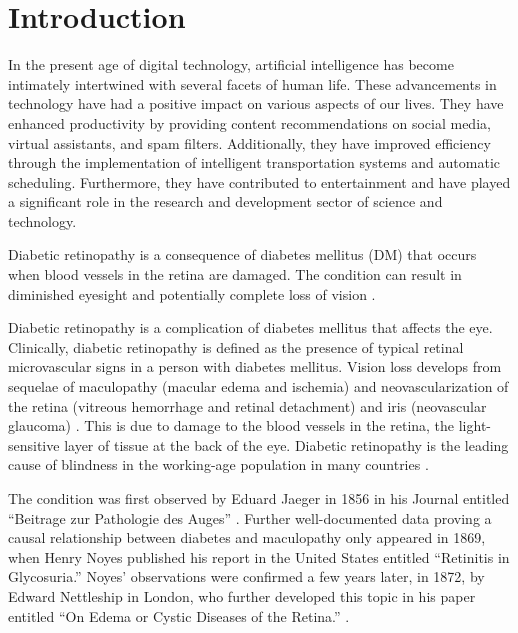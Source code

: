 \section{Introduction}
\label{sec:pendahuluan}


In the present age of digital technology, artificial intelligence has become intimately intertwined with several facets of human life. These advancements in technology have had a positive impact on various aspects of our lives. They have enhanced productivity by providing content recommendations on social media, virtual assistants, and spam filters. Additionally, they have improved efficiency through the implementation of intelligent transportation systems and automatic scheduling. Furthermore, they have contributed to entertainment and have played a significant role in the research and development sector of science and technology.
 
Diabetic retinopathy is a consequence of diabetes mellitus (DM) that occurs when blood vessels in the retina are damaged. The condition can result in diminished eyesight and potentially complete loss of vision \citet{Yusran2022}.

Diabetic retinopathy is a complication of diabetes mellitus that affects the eye. Clinically, diabetic retinopathy is defined as the presence of typical retinal microvascular signs in a person with diabetes mellitus. Vision loss develops from sequelae of maculopathy (macular edema and ischemia) and neovascularization of the retina (vitreous hemorrhage and retinal detachment) and iris (neovascular glaucoma) \citet{Cheung2010}. 
This is due to damage to the blood vessels in the retina, the light-sensitive layer of tissue at the back of the eye. Diabetic retinopathy is the leading cause of blindness in the working-age population in many countries \citet{fong2004diabetic}.

The condition was first observed by Eduard Jaeger in 1856 in his Journal entitled “Beitrage zur Pathologie des Auges” \citet{jaeger1855}. Further well-documented data proving a causal relationship between diabetes and maculopathy only appeared in 1869, when Henry Noyes published his report in the United States entitled “Retinitis in Glycosuria.” Noyes' observations were confirmed a few years later, in 1872, by Edward Nettleship in London, who further developed this topic in his paper entitled “On Edema or Cystic Diseases of the Retina.” \citet{Wolfensberger2001}.

